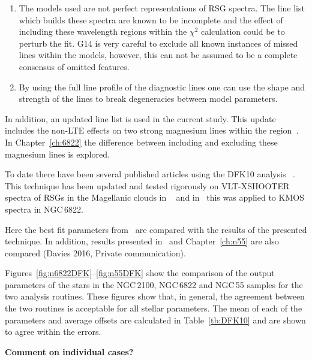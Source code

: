 \begin{enumerate}
    \item The models used are not perfect representations of RSG spectra.
    The line list which builds these spectra are known to be incomplete and the effect of including these wavelength regions within the $\chi^{2}$ calculation could be to perturb the fit. G14 is very careful to exclude all known instances of missed lines within the models, however, this can not be assumed to be a complete consensus of omitted features.

    \item By using the full line profile of the diagnostic lines one can use the shape and strength of the lines to break degeneracies between model parameters.

\end{enumerate}

In addition, an updated line list is used in the current study.
This update includes the non-LTE effects on two strong magnesium lines within the region~\citep{2015ApJ...804..113B}.
In Chapter~\ref{ch:6822} the difference between including and excluding these magnesium lines is explored.

To date there have been several published articles using the DFK10 analysis
~\citep{2010MNRAS.407.1203D,2015ApJ...803...14P,2015ApJ...806...21D}.
This technique has been updated and tested rigorously on VLT-XSHOOTER spectra of RSGs in the Magellanic clouds in
~\cite{2015ApJ...806...21D} and in~\cite[][which Chapter~\ref{ch:6822} is based upon]{2015ApJ...803...14P} this was applied to KMOS spectra in NGC\,6822.

Here the best fit parameters from~\cite{2015ApJ...803...14P} are compared with the results of the presented technique.
In addition, results presented in~\citep{2016arXiv160202702P} and Chapter~\ref{ch:n55} are also compared (Davies 2016, Private communication).

Figures~\ref{fig:n6822DFK}--\ref{fig:n55DFK} show the comparison of the output parameters of the stars in the NGC\,2100, NGC\,6822 and NGC\,55 samples for the two analysis routines.
These figures show that, in general, the agreement between the two routines is acceptable for all stellar parameters.
The mean of each of the parameters and average offsets are calculated in Table~\ref{tb:DFK10} and are shown to agree within the errors.

\textbf{Comment on individual cases?}

